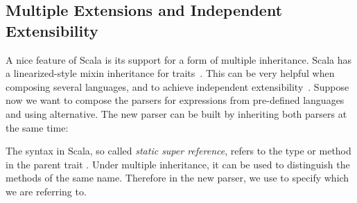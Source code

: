 \subsection{Multiple Extensions and Independent Extensibility}
A nice feature of Scala is its support for a form of multiple
inheritance.  Scala has a linearized-style mixin inheritance for
traits~\cite{odersky2004overview}. This can be very helpful when
composing several languages, and to achieve independent
extensibility~\cite{odersky2005independently}.
Suppose now we want to compose the parsers for expressions
from pre-defined languages  and
 using alternative. The new parser can be built
by inheriting both parsers at the same time:

The  syntax in Scala, so called \textit{static super reference}, refers to the type or method  in the parent trait . Under multiple inheritance, it can be used to distinguish the methods of the same name. Therefore in the new parser, we use  to specify which  we are referring to.



\begin{comment}
\bruno{You can present the abstract example, as you do
  here, but you should also present a concrete example. You
already have Var, maybe you can add another language extension for
boolean literals. Show the code for the boolean literals parsing as
well as the composition code.}

Interestingly note that, due to the use of multiple inheritance, we
need two different super calls.\bruno{expand here. People may not
be familiar with scala super calls, you have to explain what the
syntax does.}
\end{comment}


